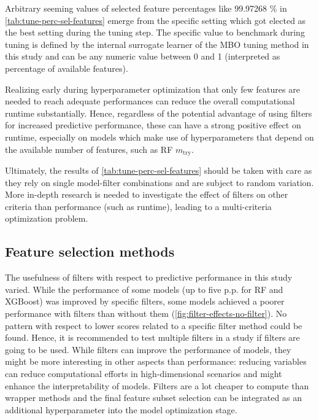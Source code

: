 \documentclass[remotesensing,article,submit,moreauthors,pdftex]{Definitions/mdpi}
\begin{document}
Arbitrary seeming values of selected feature percentages like 99.97268 \% in \autoref{tab:tune-perc-sel-features} emerge from the specific setting which got elected as the best setting during the tuning step.
The specific value to benchmark during tuning is defined by the internal surrogate learner of the MBO tuning method in this study and can be any numeric value between 0 and 1 (interpreted as percentage of available features).

Realizing early during hyperparameter optimization that only few features are needed to reach adequate performances can reduce the overall computational runtime substantially.
Hence, regardless of the potential advantage of using filters for increased predictive performance, these can have a strong positive effect on runtime, especially on models which make use of hyperparameters that depend on the available number of features, such as RF $m_\textrm{try}$.

Ultimately, the results of \autoref{tab:tune-perc-sel-features} should be taken with care as they rely on single model-filter combinations and are subject to random variation.
More in-depth research is needed to investigate the effect of filters on other criteria than performance (such as runtime), leading to a multi-criteria optimization problem.

\subsection{Feature selection methods}

The usefulness of filters with respect to predictive performance in this study varied.
While the performance of some models (up to five p.p. for RF and XGBoost) was improved by specific filters, some models achieved a poorer performance with filters than without them (\autoref{fig:filter-effects-no-filter}).
No pattern with respect to lower scores related to a specific filter method could be found.
Hence, it is recommended to test multiple filters in a study if filters are going to be used.
While filters can improve the performance of models, they might be more interesting in other aspects than performance: reducing variables can reduce computational efforts in high-dimensional scenarios and might enhance the interpretability of models.
Filters are a lot cheaper to compute than wrapper methods and the final feature subset selection can be integrated as an additional hyperparameter into the model optimization stage.
\end{document}
